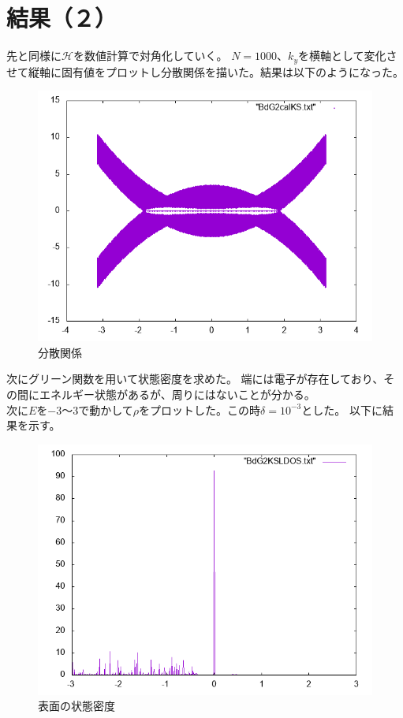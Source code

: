 \documentclass{jarticle}
\begin{document}
\section{結果（２）}
先と同様に$\mathcal{H}$を数値計算で対角化していく。
$N=1000$、$k_y$を横軸として変化させて縦軸に固有値をプロットし分散関係を描いた。結果は以下のようになった。\\
\begin{figure}[H]
	\centering
	\includegraphics[scale=0.7]{BdG2calKS.png}
	\caption{分散関係}
\end{figure}
次にグリーン関数を用いて状態密度を求めた。
端には電子が存在しており、その間にエネルギー状態があるが、周りにはないことが分かる。\\
次に$E$を$-3$〜$3$で動かして$\rho$をプロットした。この時$\delta=10^{-3}$とした。
以下に結果を示す。
\begin{figure}[H]
	\centering
	\includegraphics[scale=0.7]{BdGKSLDOSedge.png}
	\caption{表面の状態密度}
\end{figure}
\end{document}
